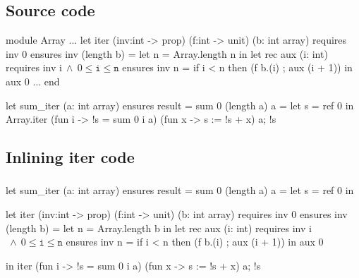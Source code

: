 \documentclass[xcolor=dvipsnames]{beamer}
\newcommand{\bwedge}{\boldsymbol{~\wedge~}}
\begin{document}
\subsection*{Source code}
\begin{frame}[fragile]
\vspace*{0em}
\begin{footnotesize}
\begin{whycode} 
module Array 
... 
   let iter (inv:int -> prop) (f:int -> unit) (b: int array)
   requires { inv 0 } 
   ensures  { inv (length b) } 
   = let n = Array.length n in
     let rec aux (i: int)
     requires { inv i$\bwedge 0 \leq \texttt{i} \leq \texttt{n}$ }
     ensures  { inv n }
     = if i < n
       then (f b.(i) ; aux (i + 1)) 
     in aux 0
...
end

let sum_iter (a: int array) 
ensures { result = sum 0 (length a) a }
= let s = ref 0 in
  Array.iter 
    (fun i -> !s = sum 0 i a) (fun x -> s := !s + x) a; 
  !s
\end{whycode} 
\end{footnotesize}
\end{frame}
\addtocounter{framenumber}{-1}

\subsection*{Inlining iter code}
\begin{frame}[fragile]
\frametitle{}
\vspace*{0em}
\begin{footnotesize}
\begin{whygray}
let sum_iter (a: int array) 
ensures { result = sum 0 (length a) a }
= let s = ref 0 in 
\end{whygray}\vspace*{-1.15em} 
\begin{whycode}
  let iter (inv:int -> prop) (f:int -> unit) (b: int array)
  requires { inv 0 } 
  ensures  { inv (length b) } 
  = let n = Array.length b in
    let rec aux (i: int)
    requires { inv i$\bwedge 0 \leq \texttt{i} \leq \texttt{n}$ }
    ensures  { inv n }
    = if i < n
      then (f b.(i) ; aux (i + 1)) 
    in aux 0 \end{whycode} \vspace*{-1.15em} 
 \begin{whygray}
  in iter (fun i -> !s = sum 0 i a) (fun x -> s := !s + x) a; 
  !s
\end{whygray}
\end{footnotesize}
\end{frame}
\addtocounter{framenumber}{-1}
\end{document}
